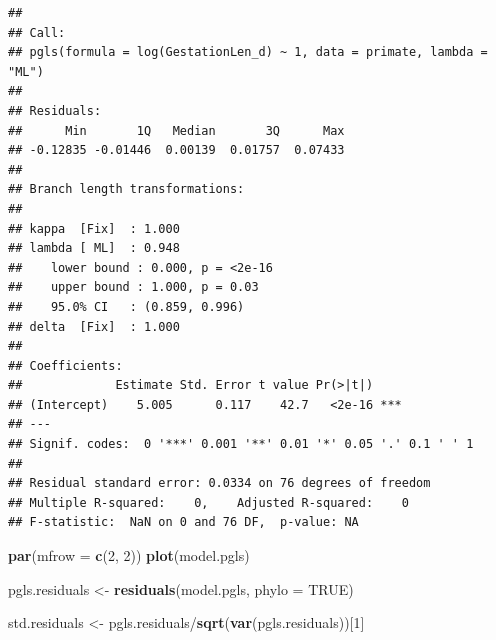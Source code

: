 \documentclass[]{article}
\newenvironment{Shaded}{\begin{snugshade}}{\end{snugshade}}
\newcommand{\KeywordTok}[1]{\textcolor[rgb]{0.13,0.29,0.53}{\textbf{{#1}}}}
\newcommand{\DataTypeTok}[1]{\textcolor[rgb]{0.13,0.29,0.53}{{#1}}}
\newcommand{\DecValTok}[1]{\textcolor[rgb]{0.00,0.00,0.81}{{#1}}}
\newcommand{\StringTok}[1]{\textcolor[rgb]{0.31,0.60,0.02}{{#1}}}
\newcommand{\OtherTok}[1]{\textcolor[rgb]{0.56,0.35,0.01}{{#1}}}
\newcommand{\NormalTok}[1]{{#1}}
\begin{document}
\begin{verbatim}
## 
## Call:
## pgls(formula = log(GestationLen_d) ~ 1, data = primate, lambda = "ML")
## 
## Residuals:
##      Min       1Q   Median       3Q      Max 
## -0.12835 -0.01446  0.00139  0.01757  0.07433 
## 
## Branch length transformations:
## 
## kappa  [Fix]  : 1.000
## lambda [ ML]  : 0.948
##    lower bound : 0.000, p = <2e-16
##    upper bound : 1.000, p = 0.03 
##    95.0% CI   : (0.859, 0.996)
## delta  [Fix]  : 1.000
## 
## Coefficients:
##             Estimate Std. Error t value Pr(>|t|)    
## (Intercept)    5.005      0.117    42.7   <2e-16 ***
## ---
## Signif. codes:  0 '***' 0.001 '**' 0.01 '*' 0.05 '.' 0.1 ' ' 1
## 
## Residual standard error: 0.0334 on 76 degrees of freedom
## Multiple R-squared:    0,    Adjusted R-squared:    0 
## F-statistic:  NaN on 0 and 76 DF,  p-value: NA
\end{verbatim}

\begin{Shaded}
\begin{Highlighting}[]
\KeywordTok{par}\NormalTok{(}\DataTypeTok{mfrow =} \KeywordTok{c}\NormalTok{(}\DecValTok{2}\NormalTok{, }\DecValTok{2}\NormalTok{))}
\KeywordTok{plot}\NormalTok{(model.pgls)}
\end{Highlighting}
\end{Shaded}

\begin{Shaded}
\begin{Highlighting}[]
\NormalTok{pgls.residuals <-}\StringTok{ }\KeywordTok{residuals}\NormalTok{(model.pgls, }\DataTypeTok{phylo =} \OtherTok{TRUE}\NormalTok{)}
\end{Highlighting}
\end{Shaded}

\begin{Shaded}
\begin{Highlighting}[]
\NormalTok{std.residuals <-}\StringTok{ }\NormalTok{pgls.residuals/}\KeywordTok{sqrt}\NormalTok{(}\KeywordTok{var}\NormalTok{(pgls.residuals))[}\DecValTok{1}\NormalTok{]}
\end{Highlighting}
\end{Shaded}

\begin{Shaded}
\end{Shaded}
\end{document}
